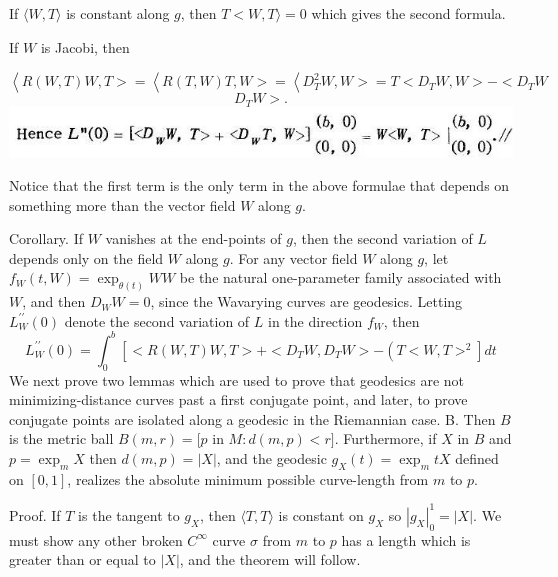 \documentclass[10pt]{article}
\begin{document}
If $\langle W, T\rangle$ is constant along $g$, then $T<W, T\rangle=0$ which gives the second formula.

If $W$ is Jacobi, then

$\left\langle R(W, T) W, T>=\left\langle R(T, W) T, W>=\left\langle D_{T}^{2} W, W>=T<D_{T} W, W>-<D_{T} W\right.\right.\right.$
$$
D_{T} W>.
$$
\includegraphics[max width=\textwidth]{2022_07_16_f4e476ee2159dc67e746g-79}

Notice that the first term is the only term in the above formulae that depends on something more than the vector field $W$ along $g$.

Corollary. If $W$ vanishes at the end-points of $g$, then the second variation of $L$ depends only on the field $W$ along $g$. For any vector field $W$ along $g$, let $f_{W}(t, W)=\exp _{\theta(t)} W W$ be the natural one-parameter family associated with $W$, and then $D_{W} W=0$, since the Wavarying curves are geodesics. Letting $L_{W}^{\prime \prime}(0)$ denote the second variation of $L$ in the direction $f_{W}$, then
$$
L_{W}^{\prime \prime}(0)=\int_{0}^{b}\left[<R(W, T) W, T>+<D_{T} W, D_{T} W>-\left(T<W, T>^{2}\right] d t\right.
$$
We next prove two lemmas which are used to prove that geodesics are not minimizing-distance curves past a first conjugate point, and later, to prove conjugate points are isolated along a geodesic in the Riemannian case. B. Then $B$ is the metric ball $B(m, r)=[p$ in $M: d(m, p)<r]$. Furthermore, if $X$ in $B$ and $p=\exp _{m} X$ then $d(m, p)=|X|$, and the geodesic $g_{X}(t)=\exp _{m} t X$ defined on $[0,1]$, realizes the absolute minimum possible curve-length from $m$ to $p$.

Proof. If $T$ is the tangent to $g_{X}$, then $\langle T, T\rangle$ is constant on $g_{X}$ so $\left|g_{X}\right|_{0}^{1}=|X|$. We must show any other broken $C^{\infty}$ curve $\sigma$ from $m$ to $p$ has a length which is greater than or equal to $|X|$, and the theorem will follow.
\end{document}
